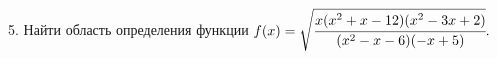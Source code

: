5. Найти область определения функции $f(x)=\sqrt{\cfrac{x(x^2+x-12)(x^2-3x+2)}{(x^2-x-6)(-x+5)}}.$\\

